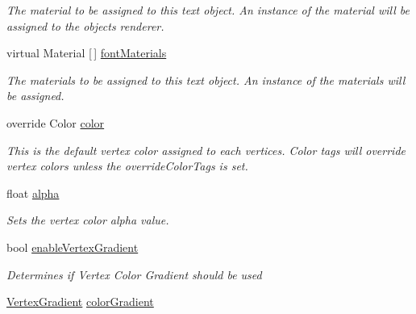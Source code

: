 \begin{DoxyCompactItemize}
\begin{DoxyCompactList}\small\item\em The material to be assigned to this text object. An instance of the material will be assigned to the object\textquotesingle{}s renderer. \end{DoxyCompactList}\item 
virtual Material \mbox{[}$\,$\mbox{]} \mbox{\hyperlink{class_t_m_pro_1_1_t_m_p___text_a9fdf319f4f5ef63d80c9a575472d800f}{font\+Materials}}
\begin{DoxyCompactList}\small\item\em The materials to be assigned to this text object. An instance of the materials will be assigned. \end{DoxyCompactList}\item 
override Color \mbox{\hyperlink{class_t_m_pro_1_1_t_m_p___text_af874b3b1f2d1565c68e0c3ad9f79e5c4}{color}}
\begin{DoxyCompactList}\small\item\em This is the default vertex color assigned to each vertices. Color tags will override vertex colors unless the override\+Color\+Tags is set. \end{DoxyCompactList}\item 
float \mbox{\hyperlink{class_t_m_pro_1_1_t_m_p___text_aca56e662ce122bb749faa1b044f29a57}{alpha}}
\begin{DoxyCompactList}\small\item\em Sets the vertex color alpha value. \end{DoxyCompactList}\item 
bool \mbox{\hyperlink{class_t_m_pro_1_1_t_m_p___text_a5965d900f445c01580bb9bba25160959}{enable\+Vertex\+Gradient}}
\begin{DoxyCompactList}\small\item\em Determines if Vertex Color Gradient should be used \end{DoxyCompactList}\item 
\mbox{\hyperlink{struct_t_m_pro_1_1_vertex_gradient}{Vertex\+Gradient}} \mbox{\hyperlink{class_t_m_pro_1_1_t_m_p___text_a9e388e5afbcba8e72a65cd00ca7001b4}{color\+Gradient}}

\end{DoxyCompactItemize}
